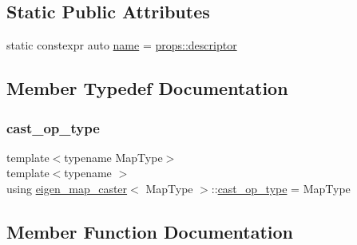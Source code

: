 \subsection*{Static Public Attributes}
\begin{DoxyCompactItemize}
\item 
static constexpr auto \mbox{\hyperlink{structeigen__map__caster_a893a5b3d3a5303bc3ab667023c1f17c9}{name}} = \mbox{\hyperlink{struct_eigen_props_aa3861d665ff4bf5df6b531008fe358ef}{props\+::descriptor}}
\end{DoxyCompactItemize}


\subsection{Member Typedef Documentation}
\mbox{\label{structeigen__map__caster_a43b715680bfd06ff00ca9caa2ca07c9d}} 
\subsubsection{\texorpdfstring{cast\_op\_type}{cast\_op\_type}}
{\footnotesize\ttfamily template$<$typename Map\+Type$>$ \\
template$<$typename $>$ \\
using \mbox{\hyperlink{structeigen__map__caster}{eigen\+\_\+map\+\_\+caster}}$<$ Map\+Type $>$\+::\mbox{\hyperlink{structeigen__map__caster_a43b715680bfd06ff00ca9caa2ca07c9d}{cast\+\_\+op\+\_\+type}} =  Map\+Type}



\subsection{Member Function Documentation}
\mbox{\label{structeigen__map__caster_aed7867693cf11abd62f586672ef45316}} 
